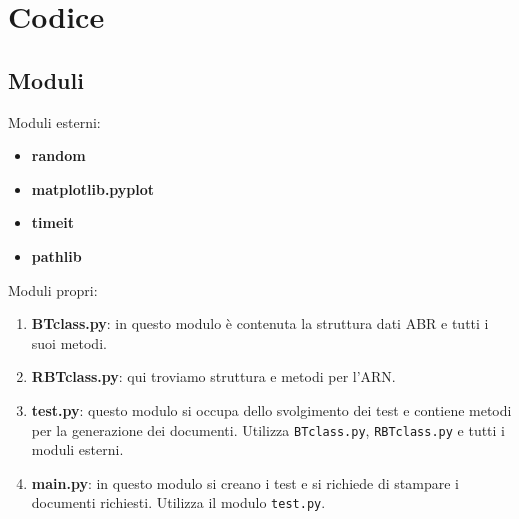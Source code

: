 \documentclass{article}
\begin{document}
\section{Codice}
\subsection{Moduli}
Moduli esterni:
\begin{itemize}
    \item \textbf{random}
    \item \textbf{matplotlib.pyplot}
    \item \textbf{timeit}
    \item \textbf{pathlib}
\end{itemize}
Moduli propri:
\begin{enumerate}
    \item \textbf{BTclass.py}: in questo modulo è contenuta la struttura dati ABR e tutti i suoi metodi.
    \item \textbf{RBTclass.py}: qui troviamo struttura e metodi per l'ARN.
    \item \textbf{test.py}: questo modulo si occupa dello svolgimento dei test e contiene metodi per la generazione dei documenti. Utilizza \verb|BTclass.py|, \verb|RBTclass.py| e tutti i moduli esterni.
    \item \textbf{main.py}: in questo modulo si creano i test e si richiede di stampare i documenti richiesti. Utilizza il modulo \verb|test.py|. 
\end{enumerate}
\end{document}
